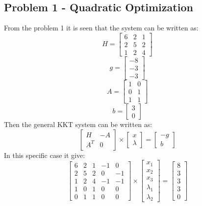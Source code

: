\subsection{Problem 1 - Quadratic Optimization}
From the problem 1 it is seen that the system can be written as:
\[H=\begin{bmatrix}
	6 & 2 & 1 \\2 & 5 & 2 \\1 & 2 & 4
\end{bmatrix}\]
\[g=\begin{bmatrix}
	-8 \\-3 \\ -3
\end{bmatrix}\]
\[A=\begin{bmatrix}
	1 & 0 \\ 0 & 1 \\ 1 & 1
\end{bmatrix}\]
\[b= \begin{bmatrix}
	3 \\ 0
\end{bmatrix}\]
Then the general KKT system can be written as:
\[\begin{bmatrix}
	H & -A \\A^T & 0
\end{bmatrix} \times \begin{bmatrix}
	x\\ \lambda
\end{bmatrix} =\begin{bmatrix}
	-g\\ b
\end{bmatrix}\]
In this specific case it give:
\[\begin{bmatrix}
	6 & 2 & 1 & -1 & 0\\2 & 5 & 2 & 0 & -1\\1 & 2 & 4 & -1 & -1 \\
1 & 0 & 1 & 0 & 0\\ 0 & 1 & 1 & 0 & 0
\end{bmatrix} \times \begin{bmatrix}
	x_1 \\ x_2 \\ x_3 \\ \lambda_1 \\ \lambda_2
\end{bmatrix} =\begin{bmatrix}
	8 \\3 \\ 3\\ 3 \\ 0
\end{bmatrix}\]
